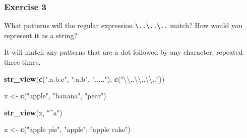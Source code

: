 \documentclass[]{book}
\newenvironment{Shaded}{\begin{snugshade}}{\end{snugshade}}
\newcommand{\CharTok}[1]{\textcolor[rgb]{0.31,0.60,0.02}{#1}}
\newcommand{\KeywordTok}[1]{\textcolor[rgb]{0.13,0.29,0.53}{\textbf{#1}}}
\newcommand{\NormalTok}[1]{#1}
\newcommand{\StringTok}[1]{\textcolor[rgb]{0.31,0.60,0.02}{#1}}
\theoremstyle{plain}
\theoremstyle{remark}
\theoremstyle{definition}
\theoremstyle{definition}
\theoremstyle{definition}
\theoremstyle{remark}
\begin{document}
\hypertarget{exercise-3-28}{%
\subsubsection{Exercise 3}\label{exercise-3-28}}

What patterns will the regular expression
\texttt{\textbackslash{}..\textbackslash{}..\textbackslash{}..} match?
How would you represent it as a string?

It will match any patterns that are a dot followed by any character,
repeated three times.

\begin{Shaded}
\begin{Highlighting}[]
\KeywordTok{str_view}\NormalTok{(}\KeywordTok{c}\NormalTok{(}\StringTok{".a.b.c"}\NormalTok{, }\StringTok{".a.b"}\NormalTok{, }\StringTok{"....."}\NormalTok{), }\KeywordTok{c}\NormalTok{(}\StringTok{"}\CharTok{\textbackslash{}\textbackslash{}}\StringTok{..}\CharTok{\textbackslash{}\textbackslash{}}\StringTok{..}\CharTok{\textbackslash{}\textbackslash{}}\StringTok{.."}\NormalTok{))}
\end{Highlighting}
\end{Shaded}

\begin{Shaded}
\begin{Highlighting}[]
\NormalTok{x <-}\StringTok{ }\KeywordTok{c}\NormalTok{(}\StringTok{"apple"}\NormalTok{, }\StringTok{"banana"}\NormalTok{, }\StringTok{"pear"}\NormalTok{)}
\end{Highlighting}
\end{Shaded}

\begin{Shaded}
\begin{Highlighting}[]
\KeywordTok{str_view}\NormalTok{(x, }\StringTok{"^a"}\NormalTok{)}
\end{Highlighting}
\end{Shaded}

\begin{Shaded}
\end{Shaded}

\begin{Shaded}
\begin{Highlighting}[]
\NormalTok{x <-}\StringTok{ }\KeywordTok{c}\NormalTok{(}\StringTok{"apple pie"}\NormalTok{, }\StringTok{"apple"}\NormalTok{, }\StringTok{"apple cake"}\NormalTok{)}
\end{Highlighting}
\end{Shaded}
\end{document}
